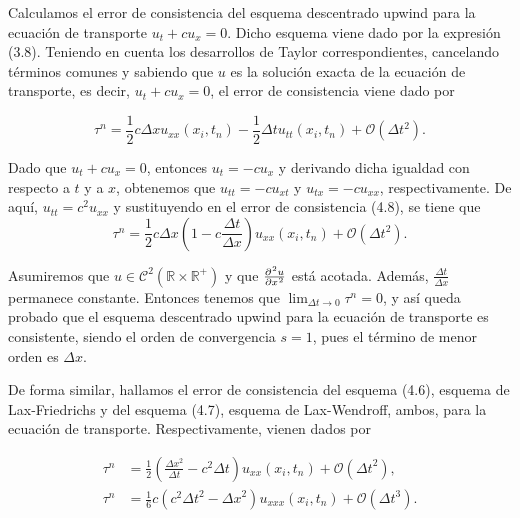 \begin{example}
  Calculamos el error de consistencia del esquema descentrado upwind para la ecuación de transporte
  \begin{math}
    u_{t}+
    cu_{x}=
    0.
  \end{math}
  Dicho esquema viene dado por la expresión (3.8).
  Teniendo en cuenta los desarrollos de Taylor correspondientes,
  cancelando términos comunes y sabiendo que $u$ es la solución
  exacta de la ecuación de transporte, es decir,
  $u_{t}+cu_{x}=0$, el error de consistencia viene dado por

  \begin{equation*}
    \tau^{n}=
    \frac{1}{2}
    c\Delta x
    u_{xx}
    \left(x_{i},t_{n}\right)-
    \frac{1}{2}\Delta t
    u_{tt}
    \left(x_{i},t_{n}\right)+
    \mathcal{O}
    \left(\Delta t^{2}\right).
  \end{equation*}

  Dado que $u_{t}+cu_{x}=0$, entonces
  $u_{t}=-cu_{x}$ y derivando dicha igualdad con respecto a $t$
  y a $x$, obtenemos que $u_{tt}=-cu_{xt}$ y $u_{tx}=-cu_{xx}$,
  respectivamente.
  De aquí, $u_{tt}=c^{2}u_{xx}$ y sustituyendo en el error de
  consistencia (4.8), se tiene que
  \begin{equation*}
    \tau^{n}=
    \frac{1}{2}
    c\Delta x
    \left(
    1-c\frac{\Delta t}{\Delta x}
    \right)
    u_{xx}
    \left(x_{i},t_{n}\right)+
    \mathcal{O}
    \left(\Delta t^{2}\right).
  \end{equation*}

  Asumiremos que $u\in\mathcal{C}^{2}\left(\mathbb{R}\times\mathbb{R}^{+}\right)$
  y que $\diffp[2]{u}{x}$ está acotada.
  Además, $\frac{\Delta t}{\Delta x}$ permanece constante.
  Entonces tenemos que $\lim_{\Delta t\to0}\tau^{n}=0$, y así queda
  probado que el esquema descentrado upwind para la
  ecuación de transporte es consistente, siendo el orden de
  convergencia $s=1$, pues el término de menor orden es $\Delta x$.
\end{example}

De forma similar, hallamos el error de consistencia del esquema (4.6),
esquema de Lax-Friedrichs y del esquema (4.7), esquema de Lax-Wendroff,
ambos, para la ecuación de transporte.
Respectivamente, vienen dados por

\begin{align*}
  \tau^{n} & =
  \frac{1}{2}
  \left(
  \frac{{\Delta x}^{2}}{\Delta t}-
  c^{2}\Delta t
  \right)
  u_{xx}
  \left(x_{i},t_{n}\right)+
  \mathcal{O}
  \left({\Delta t}^{2}\right), \\
  \tau^{n} & =
  \frac{1}{6}
  c
  \left(
  c^{2}{\Delta t}^{2}-
  {\Delta x}^{2}
  \right)
  u_{xxx}\left(x_{i},t_{n}\right)+
  \mathcal{O}\left({\Delta t}^{3}\right).
\end{align*}

